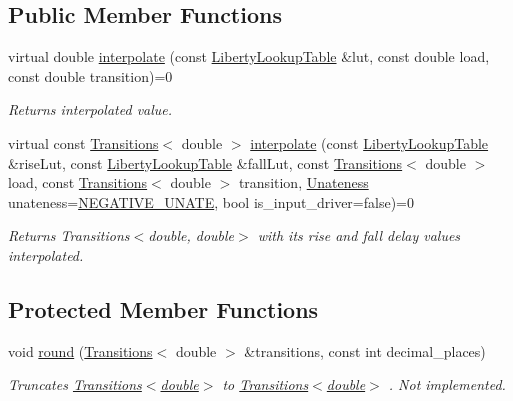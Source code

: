 \subsection*{Public Member Functions}
\begin{DoxyCompactItemize}
\item 
virtual double \hyperlink{classLibertyLookupTableInterpolator_ae12e0b9e427488bc933b54a427586f47}{interpolate} (const \hyperlink{structLibertyLookupTable}{Liberty\-Lookup\-Table} \&lut, const double load, const double transition)=0
\begin{DoxyCompactList}\small\item\em Returns interpolated value. \end{DoxyCompactList}\item 
virtual const \hyperlink{classTransitions}{Transitions}$<$ double $>$ \hyperlink{classLibertyLookupTableInterpolator_a3f840a4246b193e9e620b3ec8cadb720}{interpolate} (const \hyperlink{structLibertyLookupTable}{Liberty\-Lookup\-Table} \&rise\-Lut, const \hyperlink{structLibertyLookupTable}{Liberty\-Lookup\-Table} \&fall\-Lut, const \hyperlink{classTransitions}{Transitions}$<$ double $>$ load, const \hyperlink{classTransitions}{Transitions}$<$ double $>$ transition, \hyperlink{liberty__library_8h_aec44423ef220f800b99f85740d9cc011}{Unateness} unateness=\hyperlink{liberty__library_8h_aec44423ef220f800b99f85740d9cc011a9f0596f72cc1d35d8a8f5a6d75171948}{N\-E\-G\-A\-T\-I\-V\-E\-\_\-\-U\-N\-A\-T\-E}, bool is\-\_\-input\-\_\-driver=false)=0
\begin{DoxyCompactList}\small\item\em Returns Transitions$<$double, double$>$ with its rise and fall delay values interpolated. \end{DoxyCompactList}\end{DoxyCompactItemize}
\subsection*{Protected Member Functions}
\begin{DoxyCompactItemize}
\item 
void \hyperlink{classLibertyLookupTableInterpolator_a41f28d4091ef57ce488a26f0a3aedb0b}{round} (\hyperlink{classTransitions}{Transitions}$<$ double $>$ \&transitions, const int decimal\-\_\-places)
\begin{DoxyCompactList}\small\item\em Truncates \hyperlink{classTransitions}{Transitions$<$double$>$} to \hyperlink{classTransitions}{Transitions$<$double$>$} . Not implemented. \end{DoxyCompactList}\end{DoxyCompactItemize}
